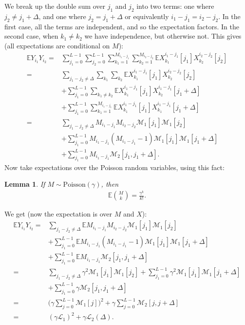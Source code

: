 \documentclass{article}
\newtheorem{lem}[thm]{Lemma}
\theoremstyle{thm}
\theoremstyle{definition}
\newcommand{\E}{\mathbb{E}}
\newcommand{\1}{\mathbf{1}}
\newcommand{\Poisson}{\text{Poisson}}
\newcommand{\M}{\mathcal{M}}
\renewcommand{\L}{\mathcal{L}}
\begin{document}
We break up the double sum over $j_1$ and $j_2$ into two terms: one where $j_2 \ne j_1 + \Delta$, and one where $j_2 = j_1 + \Delta$ or equivalently $i_1-j_1 = i_2-j_2$. In the first case, all the terms are independent, and so the expectation factors. In the second case, when $k_1 \ne k_2$ we have independence, but otherwise not. This gives (all expectations are conditional on $M$):
%
\begin{align}
%
\E Y_{i_1} Y_{i_2}
=& \sum_{j_1=0}^{L-1} \sum_{j_2=0}^{L-1} 
    \sum_{k_1=1}^{M_{i_1-j_1}}\sum_{k_2=1}^{M_{i_2-j_2}}
        \E X_{k_1}^{i_1-j_1}[j_1] X_{k_2}^{i_2 - j_2}[j_2]
    \nonumber \\
=& \sum_{j_1 - j_2 \ne \Delta} \sum_{k_1} 
    \sum_{k_2} \E X_{k_1}^{i_1-j_1}[j_1] X_{k_2}^{i_2 - j_2}[j_2]
    \nonumber \\
    & + \sum_{j_1 = 0}^{L-1} \sum_{k_1 \ne k_2} 
        \E X_{k_1}^{i_1-j_1}[j_1] X_{k_2}^{i_1 - j_1}[j_1+\Delta]
    \nonumber \\
    & + \sum_{j_1 = 0}^{L-1} \sum_{k_1=1}^{M_{i_1-j_1}} 
        \E X_{k_1}^{i_1-j_1}[j_1] X_{k_1}^{i_1-j_1}[j_1 + \Delta] 
    \nonumber \\
=& \sum_{j_1 - j_2 \ne \Delta} M_{i_1-j_1} M_{i_2 - j_2} \M_1[j_1] \M_1[j_2]
    \nonumber \\
    & + \sum_{j_1 = 0}^{L-1} M_{i_1-j_1}(M_{i_1-j_1} - 1) \M_1[j_1] \M_1[j_1 + \Delta]
    \nonumber \\
    & + \sum_{j_1 = 0}^{L-1} M_{i_1-j_1} \M_2[j_1,j_1 + \Delta] .
%
\end{align}
%
Now take expectations over the Poisson random variables, using this fact:
%
\begin{lem} \label{lem-choose}
If $M \sim \Poisson(\gamma)$, then 
\begin{align}
%
\E {M\choose k} = \frac{\gamma^k}{k!}.
%
\end{align}
\end{lem}


We get (now the expectation is over $M$ and $X$):
%
\begin{align}
%
\E Y_{i_1} Y_{i_2} 
=& \sum_{j_1 - j_2 \ne \Delta} \E M_{i_1-j_1} M_{i_2 - j_2} \M_1[j_1] \M_1[j_2]
    \nonumber \\
    & + \sum_{j_1 = 0}^{L-1} \E M_{i_1-j_1}(M_{i_1-j_1} - 1) \M_1[j_1] \M_1[j_1 + \Delta]
    \nonumber \\
    & + \sum_{j_1 = 0}^{L-1} \E M_{i_1-j_1} \M_2[j_1,j_1 + \Delta]
    \nonumber \\
=& \sum_{j_1 - j_2 \ne \Delta} \gamma^2 \M_1[j_1] \M_1[j_2]
    + \sum_{j_1 = 0}^{L-1} \gamma^2 \M_1[j_1] \M_1[j_1 + \Delta]
    \nonumber \\
    & + \sum_{j_1 = 0}^{L-1} \gamma \M_2[j_1,j_1 + \Delta]
    \nonumber \\
=&  \bigg(\gamma \sum_{j = 0}^{L-1} \M_1[j] \bigg)^2
    + \gamma \sum_{j = 0}^{L-1} \M_2[j,j + \Delta]
    \nonumber \\
=&  (\gamma \L_1)^2 + \gamma \L_2(\Delta).
%
\end{align}
\end{document}
